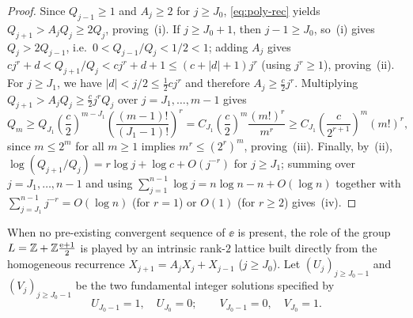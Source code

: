 \begin{proof}
Since $Q_{j-1}\ge1$ and $A_j\ge2$ for $j\ge J_0$, \eqref{eq:poly-rec} yields
$Q_{j+1}>A_jQ_j\ge2Q_j$, proving~(i). If $j\ge J_0+1$, then $j-1\ge J_0$, so~(i)
gives $Q_j>2Q_{j-1}$, i.e.\ $0<Q_{j-1}/Q_j<1/2<1$; adding $A_j$ gives
$cj^r+d<Q_{j+1}/Q_j<cj^r+d+1\le(c+|d|+1)j^r$ (using $j^r\ge1$), proving~(ii). For
$j\ge J_1$, we have $|d|<j/2\le\frac12 cj^r$ and therefore $A_j\ge\frac{c}{2}j^r$.
Multiplying $Q_{j+1}>A_jQ_j\ge\frac{c}{2}j^r Q_j$ over $j=J_1,\dots,m-1$ gives
\[
Q_m\ge Q_{J_1}\left(\frac{c}{2}\right)^{m-J_1}
\left(\frac{(m-1)!}{(J_1-1)!}\right)^r
=C_{J_1}\left(\frac{c}{2}\right)^m\frac{(m!)^r}{m^r}
\ge C_{J_1}\left(\frac{c}{2^{r+1}}\right)^m(m!)^r,
\]
since $m\le2^m$ for all $m\ge1$ implies $m^r\le(2^r)^m$, proving~(iii). Finally,
by~(ii), $\log(Q_{j+1}/Q_j)=r\log j+\log c+O(j^{-r})$ for $j\ge J_1$; summing
over $j=J_1,\dots,n-1$ and using $\sum_{j=1}^{n-1}\log j=n\log n-n+O(\log n)$
together with $\sum_{j=J_1}^{n-1}j^{-r}=O(\log n)$ (for $r=1$) or $O(1)$ (for
$r\ge2$) gives~(iv).
\end{proof}

When no pre-existing convergent sequence of $\ee$ is present, the role of the
group $L=\mathbb{Z}+\mathbb{Z}\frac{\mathrm{e}+1}{2}$ is played by an intrinsic rank-$2$ lattice built
directly from the homogeneous recurrence $X_{j+1}=A_jX_j+X_{j-1}$ ($j\ge J_0$).
Let $(U_j)_{j\ge J_0-1}$ and $(V_j)_{j\ge J_0-1}$ be the two fundamental integer
solutions specified by
\[
U_{J_0-1}=1,\quad U_{J_0}=0;\qquad V_{J_0-1}=0,\quad V_{J_0}=1.
\]


